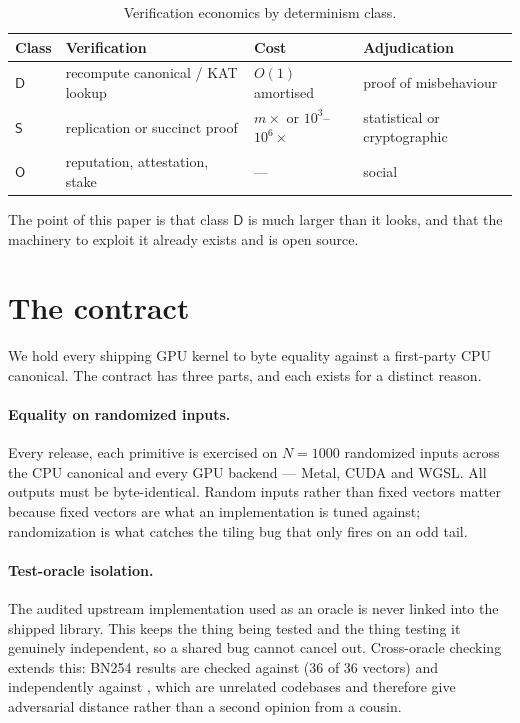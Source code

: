 \documentclass[11pt,a4paper]{article}
\begin{document}
\begin{table}[h]
\centering
\begin{tabular}{llll}
\toprule
Class & Verification & Cost & Adjudication \\
\midrule
$\mathsf{D}$ & recompute canonical / KAT lookup & $O(1)$ amortised & proof of misbehaviour \\
$\mathsf{S}$ & replication or succinct proof & $m\times$ or $10^{3}$--$10^{6}\times$ & statistical or cryptographic \\
$\mathsf{O}$ & reputation, attestation, stake & --- & social \\
\bottomrule
\end{tabular}
\caption{Verification economics by determinism class.}
\end{table}

The point of this paper is that class $\mathsf{D}$ is much larger than it looks,
and that the machinery to exploit it already exists and is open source.

\section{The contract}

We hold every shipping GPU kernel to byte equality against a first-party CPU
canonical. The contract has three parts, and each exists for a distinct reason.

\paragraph{Equality on randomized inputs.} Every release, each primitive is
exercised on $N = 1000$ randomized inputs across the CPU canonical and every GPU
backend --- Metal, CUDA and WGSL. All outputs must be byte-identical. Random
inputs rather than fixed vectors matter because fixed vectors are what an
implementation is tuned against; randomization is what catches the tiling bug
that only fires on an odd tail.

\paragraph{Test-oracle isolation.} The audited upstream implementation used as
an oracle is never linked into the shipped library. This keeps the thing being
tested and the thing testing it genuinely independent, so a shared bug cannot
cancel out. Cross-oracle checking extends this: BN254 results are checked
against  (36 of 36 vectors) and independently against
, which are unrelated codebases and therefore give adversarial
distance rather than a second opinion from a cousin.
\end{document}
